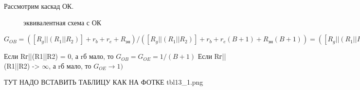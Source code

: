 \documentclass[12pt,a4paper]{article}
\begin{document}
Рассмотрим каскад ОК.

\begin{center}
        \begin{figure}[h!]
                \caption{эквивалентная схема с ОК}
                \label{OK1}
        \end{figure}
\end{center}

$G_\textit{OB} = ([R_g ||(R_1||R_2)] + r_b+r_e+R_\textit{эн})/([R_g ||(R_1||R_2)] + r_b+r_e(B+1) + R_\textit{эн}(B+1)) = ([R_g ||(R_1||R_2)] + r_b+r_e+R_\textit{эн})/([R_g ||(R_1||R_2)] + (r_b+r_e+R_\textit{эн})*(B+1))$

Если Rг||(R1||R2) = 0, а rб мало, то $G_\textit{OB}=G_\textit{OE} =1/(B+1)$
Если Rг||(R1||R2) -> $\infty$, а rб мало, то $G_\textit{OE} \longrightarrow 1)$

ТУТ НАДО ВСТАВИТЬ ТАБЛИЦУ КАК НА ФОТКЕ tbl13_1.png
\end{document}
